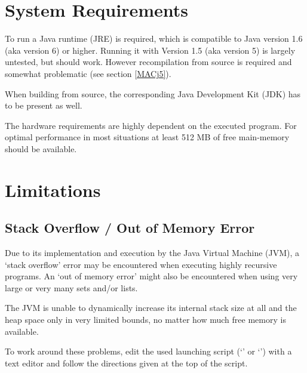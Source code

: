 \section{System Requirements}

To run \setlX{} a Java runtime (JRE) is required, which is compatible to Java version 1.6 (aka version 6) or higher. Running it with Version 1.5 (aka version 5) is largely untested, but should work. However recompilation from source is required and somewhat problematic (see section \ref{MACj5}).

When building from source, the corresponding Java Development Kit (JDK) has to be present as well.

The hardware requirements are highly dependent on the executed \SetlX{} program. For optimal performance in most situations at least 512 MB of free main-memory should be available.

\section{Limitations}

\subsection{Stack Overflow \slash{} Out of Memory Error}

Due to its implementation and execution by the Java Virtual Machine (JVM), a `stack overflow' error may be encountered when executing highly recursive \SetlX{} programs. An `out of memory error' might also be encountered when using very large or very many sets and\slash{}or lists.

The JVM is unable to dynamically increase its internal stack size at all and the heap space only in very limited bounds, no matter how much free memory is available.

To work around these problems, edit the used launching script (`' or `') with a text editor and follow the directions given at the top of the script.

%


